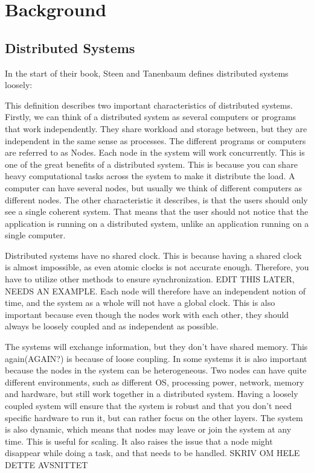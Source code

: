 \chapter{Background}


\section{Distributed Systems}
In the start of their book, Steen and Tanenbaum\cite{steen_distributed_2017} defines distributed systems loosely: 

This definition describes two important characteristics of distributed systems. Firstly, we can think of a distributed system as several computers or programs that work independently. They share workload and storage between, but they are independent in the same sense as processes. The different programs or computers are referred to as Nodes. Each node in the system will work concurrently. This is one of the great benefits of a distributed system. This is because you can share heavy computational tasks across the system to make it distribute the load. A computer can have several nodes, but usually we think of different computers as different nodes. The other characteristic it describes, is that the users should only see a single coherent system. That means that the user should not notice that the application is running on a distributed system, unlike an application running on a single computer.

Distributed systems have no shared clock. This is because having a shared clock is almost impossible, as even atomic clocks is not accurate enough. Therefore, you have to utilize other methods to ensure synchronization. EDIT THIS LATER, NEEDS AN EXAMPLE. Each node will therefore have an independent notion of time, and the system as a whole will not have a global clock\cite{steen_distributed_2017}. This is also important because even though the nodes work with each other, they should always be loosely coupled and as independent as possible.

The systems will exchange information, but they don’t have shared memory. This again(AGAIN?) is because of loose coupling. In some systems it is also important because the nodes in the system can be heterogeneous. Two nodes can have quite different environments, such as different OS, processing power, network, memory and hardware, but still work together in a distributed system. Having a loosely coupled system will ensure that the system is robust and that you don't need specific hardware to run it, but can rather focus on the other layers. The system is also dynamic, which means that nodes may leave or join the system at any time. This is useful for scaling. It also raises the issue that a node might disappear while doing a task, and that needs to be handled. SKRIV OM HELE DETTE AVSNITTET


